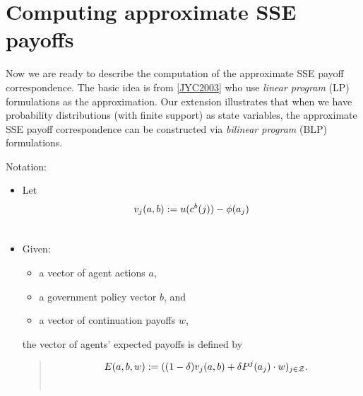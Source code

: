 \documentclass[a4paper,10pt,english]{sphinxmanual}
\begin{document}
\begin{DUlineblock}{0em}
\item[] 
\item[] 
\item[] 
\end{DUlineblock}


\chapter{Computing approximate SSE payoffs}
\label{payoff_compute:computing-approximate-sse-payoffs}\label{payoff_compute::doc}
Now we are ready to describe the computation of the approximate SSE payoff correspondence. The basic idea is from {\hyperref[payoff_compute:jyc2003]{{[}JYC2003{]}}} who use \emph{linear program} (LP) formulations as the approximation. Our extension illustrates that when we have probability distributions (with finite support) as state variables, the approximate SSE payoff correspondence can be constructed via \emph{bilinear program} (BLP) formulations.

Notation:
\begin{itemize}
\item {} 
Let
\begin{gather}
\begin{split}v_j(a,b) := u(c^b(j))-\phi(a_j)\end{split}\notag\\\begin{split}\end{split}\notag
\end{gather}
\item {} 
Given:
\begin{itemize}
\item {} 
a vector of agent actions $a$,

\item {} 
a government policy vector $b$, and

\item {} 
a vector of continuation payoffs $w$,

\end{itemize}

the vector of agents' expected payoffs is defined by
\begin{quote}
\begin{gather}
\begin{split}E(a,b,w):=((1-\delta)v_j(a,b)+\delta P^j(a_j)\cdot w)_{j\in \mathcal{Z}}.\end{split}\notag\\\begin{split}\end{split}\notag
\end{gather}\end{quote}

\end{itemize}
\end{document}

